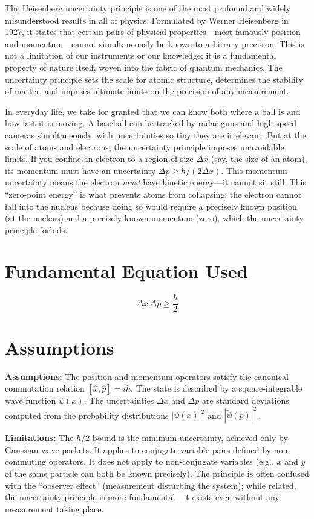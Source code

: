 \documentclass[11pt,openright]{book}
\begin{document}
The Heisenberg uncertainty principle is one of the most profound and widely misunderstood results in all of physics. Formulated by Werner Heisenberg in 1927, it states that certain pairs of physical properties---most famously position and momentum---cannot simultaneously be known to arbitrary precision. This is not a limitation of our instruments or our knowledge; it is a fundamental property of nature itself, woven into the fabric of quantum mechanics. The uncertainty principle sets the scale for atomic structure, determines the stability of matter, and imposes ultimate limits on the precision of any measurement.

In everyday life, we take for granted that we can know both where a ball is and how fast it is moving. A baseball can be tracked by radar guns and high-speed cameras simultaneously, with uncertainties so tiny they are irrelevant. But at the scale of atoms and electrons, the uncertainty principle imposes unavoidable limits. If you confine an electron to a region of size $\Delta x$ (say, the size of an atom), its momentum must have an uncertainty $\Delta p \geq \hbar/(2\Delta x)$. This momentum uncertainty means the electron \emph{must} have kinetic energy---it cannot sit still. This ``zero-point energy'' is what prevents atoms from collapsing: the electron cannot fall into the nucleus because doing so would require a precisely known position (at the nucleus) and a precisely known momentum (zero), which the uncertainty principle forbids.
\section*{Fundamental Equation Used}

\begin{equation}
\Delta x\,\Delta p \geq \frac{\hbar}{2}
\end{equation}
\section*{Assumptions}

\textbf{Assumptions:} The position and momentum operators satisfy the canonical commutation relation $[\hat{x},\hat{p}] = i\hbar$. The state is described by a square-integrable wave function $\psi(x)$. The uncertainties $\Delta x$ and $\Delta p$ are standard deviations computed from the probability distributions $|\psi(x)|^2$ and $|\tilde{\psi}(p)|^2$.


\textbf{Limitations:} The $\hbar/2$ bound is the minimum uncertainty, achieved only by Gaussian wave packets. It applies to conjugate variable pairs defined by non-commuting operators. It does not apply to non-conjugate variables (e.g., $x$ and $y$ of the same particle can both be known precisely). The principle is often confused with the ``observer effect'' (measurement disturbing the system); while related, the uncertainty principle is more fundamental---it exists even without any measurement taking place.
\end{document}
